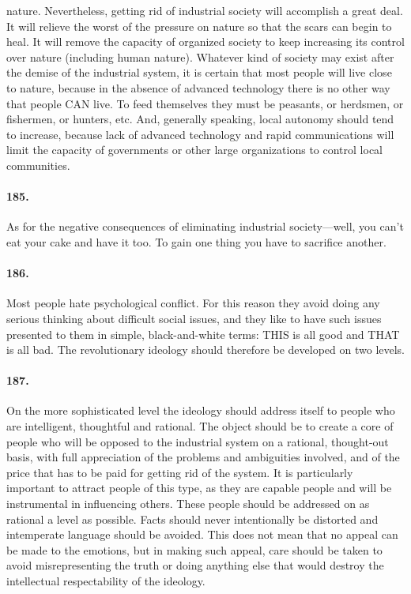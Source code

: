 \documentclass[12pt]{book}
\begin{document}
nature. Nevertheless, getting rid of industrial society will accomplish a great deal. It will relieve the worst of the pressure on nature so that the scars can begin to heal. It will remove the capacity of organized society to keep increasing its control over nature (including human nature). Whatever kind of society may exist after the demise of the industrial system, it is certain that most people will live close to nature, because in the absence of advanced technology there is no other way that people CAN live. To feed themselves they must be peasants, or herdsmen, or fishermen, or hunters, etc. And, generally speaking, local autonomy should tend to increase, because lack of advanced technology and rapid communications will limit the capacity of governments or other large organizations to control local communities.


\paragraph{185.} As for the negative consequences of eliminating industrial society---well, you can't eat your cake and have it too. To gain one thing you have to sacrifice another.


\paragraph{186.} Most people hate psychological conflict. For this reason they avoid doing any serious thinking about difficult social issues, and they like to have such issues presented to them in simple, black-and-white terms: THIS is all good and THAT is all bad. The revolutionary ideology should therefore be developed on two levels.


\paragraph{187.} On the more sophisticated level the ideology should address itself to people who are intelligent, thoughtful and rational. The object should be to create a core of people who will be opposed to the industrial system on a rational, thought-out basis, with full appreciation of the problems and ambiguities involved, and of the price that has to be paid for getting rid of the system. It is particularly important to attract people of this type, as they are capable people and will be instrumental in influencing others. These people should be addressed on as rational a level as possible. Facts should never intentionally be distorted and intemperate language should be avoided.  This does not mean that no appeal can be made to the emotions, but in making such appeal, care should be taken to avoid misrepresenting the truth or doing anything else that would destroy the intellectual respectability of the ideology.
\end{document}
